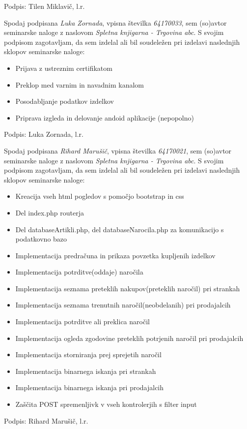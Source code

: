 \documentclass[a4paper,12pt]{report}
\newcommand{\naslov}     {Spletna knjigarna - Trgovina abc}
\newcommand{\prviavtor}  {Tilen Miklavič}
\newcommand{\drugiavtor} {Luka Zornada}
\newcommand{\drugiindeks}{64170033}
\newcommand{\tretjiavtor} {Rihard Marušič}
\newcommand{\tretjiindeks}{64170021}
\begin{document}
Podpis: {\prviavtor}, l.r.

\newpage

Spodaj podpisana \textit{\drugiavtor}, vpisna številka \textit{\drugiindeks}, sem (so)avtor seminarske naloge z naslovom \textit{\naslov}. S svojim podpisom zagotavljam, da sem izdelal ali bil soudeležen pri izdelavi naslednjih sklopov seminarske naloge:
\begin{itemize}
	\item Prijava z ustreznim certifikatom
        \item Preklop med varnim in navadnim kanalom
        \item Posodabljanje podatkov izdelkov
        \item Priprava izgleda in delovanje andoid aplikacije (nepopolno)
\end{itemize}

Podpis: {\drugiavtor}, l.r.

\newpage

Spodaj podpisana \textit{\tretjiavtor}, vpisna številka \textit{\tretjiindeks}, sem (so)avtor seminarske naloge z naslovom \textit{\naslov}. S svojim podpisom zagotavljam, da sem izdelal ali bil soudeležen pri izdelavi naslednjih sklopov seminarske naloge:\newline
\begin{itemize}
    \item Kreacija vseh html pogledov s pomočjo bootstrap in css
	 \item Del index.php routerja
	 \item Del databaseArtikli.php, del databaseNarocila.php za komunikacijo s podatkovno bazo
	 \item Implementacija predračuna in prikaza povzetka kupljenih izdelkov
	 \item Implementacija potrditve(oddaje) naročila
	 \item Implementacija seznama preteklih nakupov(preteklih naročil) pri strankah
	 \item Implementacija seznama trenutnih naročil(neobdelanih) pri prodajalcih
	 \item Implementacija potrditve ali preklica naročil
	 \item Implementacija ogleda zgodovine preteklih potrjenih naročil pri prodajalcih
	 \item Implementacija storniranja prej sprejetih naročil
	 \item Implementacija binarnega iskanja pri strankah
	 \item Implementacija binarnega iskanja pri prodajalcih
	 \item Zaščita POST spremenljivk v vseh kontrolerjih s filter input
\end{itemize}

Podpis: {\tretjiavtor}, l.r.
\end{document}

